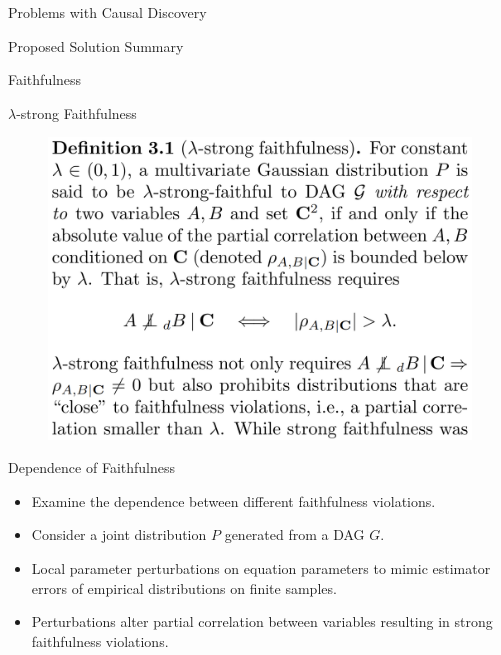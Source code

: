 \documentclass{beamer}
\begin{document}
\begin{frame}{Problems with Causal Discovery}
\end{frame}

\begin{frame}{Proposed Solution Summary}
\end{frame}

\begin{frame}{Faithfulness}
\end{frame}

\begin{frame}{$\lambda$-strong Faithfulness}
	\begin{figure}
		\includegraphics[scale=0.15]{imgs/def31.png}
	\end{figure}
\end{frame}

\begin{frame}{Dependence of Faithfulness}
	\begin{itemize}
		\item Examine the dependence between different faithfulness violations.
		\item Consider a joint distribution $ P $ generated from a DAG $ G $. 
		\item Local parameter perturbations on equation parameters to mimic estimator errors of empirical distributions on finite samples.
		\item Perturbations alter partial correlation between variables resulting in strong faithfulness violations.

	\end{itemize}
\end{frame}
\end{document}
